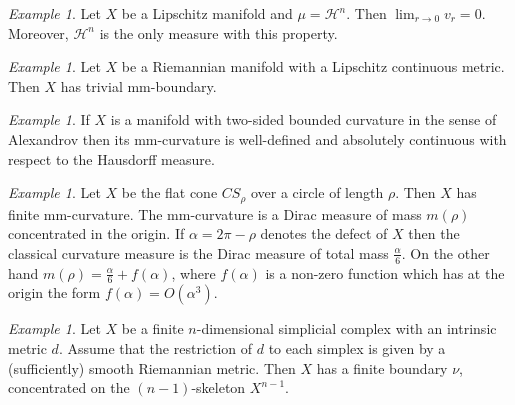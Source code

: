 \documentclass[12pt,leqno]{amsart}
\numberwithin{equation}{section}
\theoremstyle{definition}
\theoremstyle{remark}
\newtheorem{ex}[thm]{Example}
\begin{document}
\begin{ex} Let $X$ be a Lipschitz manifold and $\mu=\mathcal H^n$.
Then $\lim _{r\to 0} v_r =0$.  Moreover, $\mathcal H^n$ is the only measure with this property.
\end{ex}












\begin{ex}
Let $X$ be a Riemannian manifold with a Lipschitz continuous metric.
Then $X$ has  trivial mm-boundary.
\end{ex}


 \begin{ex}
  If $X$ is a manifold with  two-sided bounded curvature in the sense of Alexandrov then its
  mm-curvature   is  well-defined and  absolutely continuous with respect to the Hausdorff measure.
 \end{ex}




\begin{ex} \label{ex:cone}
 Let $X$ be the flat cone $CS_{\rho}$ over a circle of length $\rho$.
  Then $X$ has finite mm-curvature. The mm-curvature is a Dirac measure of mass $m(\rho)$ concentrated in the origin.
  If $\alpha =2\pi-\rho$ denotes the defect of $X$ then the classical curvature measure is the Dirac measure of total mass
  $\frac \alpha 6$.  On the other hand $m(\rho)= \frac \alpha 6 + f(\alpha)$, where
  $f(\alpha)$ is a non-zero function which has at the origin the form $f(\alpha)= O(\alpha ^3)$.
   \end{ex}




 \begin{ex}  \label{ex:secondlast}
 Let $X$ be a finite $n$-dimensional simplicial complex with an intrinsic metric $d$.
 Assume that the restriction of $d$ to each simplex is given by a (sufficiently) smooth Riemannian metric.
 Then $X$ has a finite boundary $\nu$, concentrated on  the $(n-1)$-skeleton $X^{n-1}$.
 \end{ex}
\end{document}
